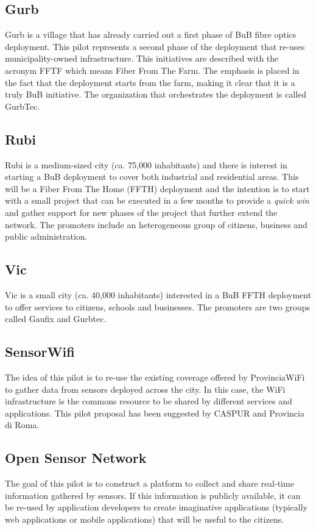 \documentclass[conference]{IEEEtran}
\begin{document}
\subsection{Gurb}
Gurb is a village that has already carried out a first phase of BuB fibre optics deployment.
This pilot represents a second phase of the deployment that re-uses municipality-owned infrastructure.
This initiatives are described with the acronym FFTF which means Fiber From The Farm.
The emphasis is placed in the fact that the deployment starts from the farm, making it clear that it is a truly BuB initiative.
The organization that orchestrates the deployment is called GurbTec.

\subsection{Rubi}
Rubi is a medium-sized city (ca. 75,000 inhabitants) and there is interest in starting a BuB deployment to cover both industrial and residential areas.
This will be a Fiber From The Home (FFTH) deployment and the intention is to start with a small project that can be executed in a few months to provide a \emph{quick win} and gather support for new phases of the project that further extend the network.
The promoters include an heterogeneous group of citizens, business and public administration.

\subsection{Vic}
Vic is a small city (ca. 40,000 inhabitants) interested in a BuB FFTH deployment to offer services to citizens, schools and businesses.
The promoters are two groups called Gaufix and Gurbtec.

\subsection{SensorWifi}
The idea of this pilot is to re-use the existing coverage offered by ProvinciaWiFi to gather data from sensors deployed across the city.
In this case, the WiFi infrastructure is the commons resource to be shared by different services and applications.
This pilot proposal has been suggested by CASPUR and Provincia di Roma.

\subsection{Open Sensor Network}
The goal of this pilot is to construct a platform to collect and share real-time information gathered by sensors.
If this information is publicly available, it can be re-used by application developers to create imaginative applications (typically web applications or mobile applications) that will be useful to the citizens.
\end{document}
